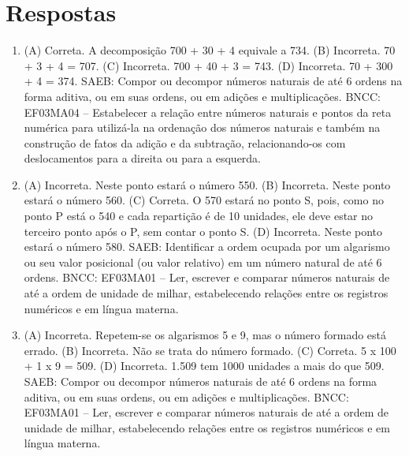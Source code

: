 \chapter{Respostas}
\pagestyle{plain}
\footnotesize

\pagecolor{gray!40}


\begin{enumerate}
\item
(A) Correta. A decomposição 700 + 30 + 4 equivale a 734.
(B) Incorreta. 70 + 3 + 4 = 707.
(C) Incorreta. 700 + 40 + 3 = 743.
(D) Incorreta. 70 + 300 + 4 = 374.
SAEB: Compor ou decompor números naturais de até 6 ordens na forma aditiva, ou em suas ordens, ou em adições e multiplicações.
BNCC: EF03MA04 -- Estabelecer a relação entre números naturais e pontos da reta numérica para
utilizá-la na ordenação dos números naturais e também na construção de fatos da adição e da
subtração, relacionando-os com deslocamentos para a direita ou para a esquerda.

\item
(A) Incorreta. Neste ponto estará o número 550.
(B) Incorreta. Neste ponto estará o número 560.
(C) Correta. O 570 estará no ponto S, pois, como no ponto P está o 540 e cada
repartição é de 10 unidades, ele deve estar no terceiro ponto após o P,
sem contar o ponto S.
(D) Incorreta. Neste ponto estará o número 580.
SAEB: Identificar a ordem ocupada por um algarismo ou seu valor posicional (ou valor relativo) em um número natural de até 6 ordens.
BNCC: EF03MA01 -- Ler, escrever e comparar números naturais de até a ordem de unidade de milhar, estabelecendo relações entre os registros numéricos e em língua materna.

\item
(A) Incorreta. Repetem-se os algarismos 5 e 9, mas o número formado está errado.
(B) Incorreta. Não se trata do número formado.
(C) Correta. 5 x 100 + 1 x 9 = 509.
(D) Incorreta. 1.509 tem 1000 unidades a mais do que 509.
SAEB: Compor ou decompor números naturais de até 6 ordens na forma aditiva, ou em suas ordens, ou em adições e multiplicações.
BNCC: EF03MA01 -- Ler, escrever e comparar números naturais de até a ordem de unidade de milhar, estabelecendo relações entre os registros numéricos e em língua materna.
\end{enumerate}


